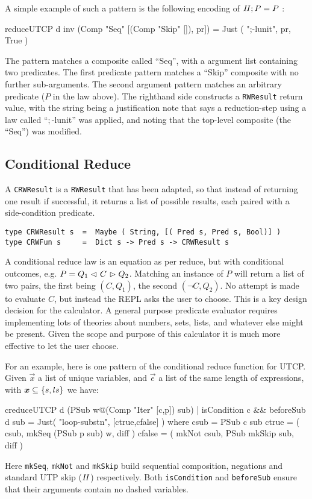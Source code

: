 A simple example of such a pattern is the following encoding
of $\mathit{II};P = P$ :
\begin{code}
reduceUTCP d inv (Comp "Seq" [(Comp "Skip" []), pr])
   =  Just ( ";-lunit", pr, True )
\end{code}
The pattern
matches a composite called ``Seq'',
with a argument list containing two predicates.
The first predicate pattern
matches a ``Skip'' composite with no further sub-arguments.
The second argument pattern matches an arbitrary predicate
($P$ in the law above).
The righthand side constructs a \texttt{RWResult} return value,
with the string being a justification note that says a reduction-step
using a law called ``$;$-lunit'' was applied,
and noting that the top-level composite (the ``Seq'') was modified.


\subsection{Conditional Reduce}

A \texttt{CRWResult} is a \texttt{RWResult} that has been adapted,
so that instead of returning one result if successful,
it returns a list of possible results,
each paired with a side-condition predicate.
\begin{verbatim}
type CRWResult s  =  Maybe ( String, [( Pred s, Pred s, Bool)] )
type CRWFun s     =  Dict s -> Pred s -> CRWResult s
\end{verbatim}
A conditional reduce law is an equation as per reduce,
but with conditional outcomes, e.g. $P = Q_1 \mathrel{\lhd ~ {C} ~ \rhd} Q_2$.
Matching an instance of $P$ will return a list of two pairs,
the first being $(C,Q_1)$, the second $(\lnot C,Q_2)$.
No attempt is made to evaluate $C$, but instead the REPL
asks the user to choose.
This is a key design decision for the calculator.
A general purpose predicate evaluator requires implementing
lots of theories about numbers, sets, lists,
and whatever else might be present.
Given the scope and purpose of this calculator it is
much more effective to let the user choose.

For an example,
here is one pattern of the conditional reduce
function for UTCP.
Given $\vec x$ a list of unique variables,
and $\vec e$ a list of the same length of expressions,
with $\vec x \subseteq \setof{s,ls}$
we have:
\begin{code}
creduceUTCP d (PSub w@(Comp "Iter" [c,p]) sub)
 | isCondition c && beforeSub d sub
 = Just( "loop-substn", [ctrue,cfalse] )
 where
   csub = PSub c sub
   ctrue  = (       csub, mkSeq (PSub p sub) w, diff )
   cfalse = ( mkNot csub, PSub mkSkip sub,      diff )
\end{code}
Here \texttt{mkSeq}, \texttt{mkNot} and \texttt{mkSkip} build sequential composition,
negations and standard UTP skip ($\mathit{II}$) respectively.
Both \texttt{isCondition} and \texttt{beforeSub}
ensure that their arguments contain no dashed variables.



